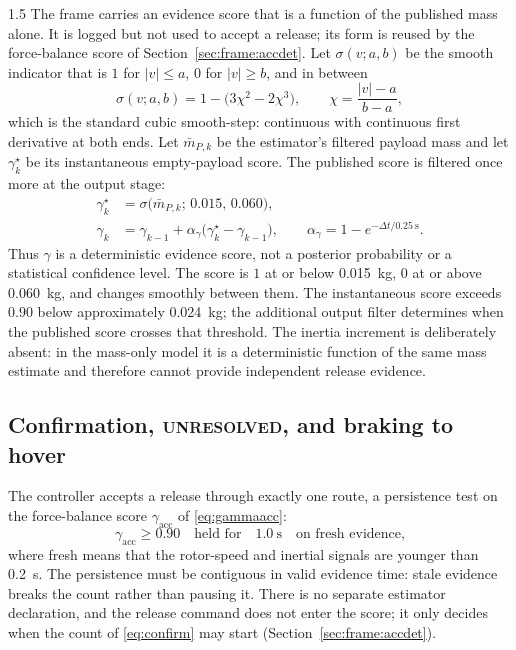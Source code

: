 \begin{spacing}{1.5}
The frame carries an evidence score that is a function of the published mass
alone. It is logged but not used to accept a release; its form is reused by the
force-balance score of Section~\ref{sec:frame:accdet}. Let
$\sigma(v;a,b)$ be the smooth indicator that is $1$
for $|v|\le a$, $0$ for $|v|\ge b$, and in between
\begin{equation}
\sigma(v;a,b) = 1 - \bigl(3\chi^2 - 2\chi^3\bigr),
\qquad \chi = \frac{|v|-a}{b-a},
\label{eq:smoothstep}
\end{equation}
which is the standard cubic smooth-step: continuous with continuous first
derivative at both ends. Let $\bar m_{P,k}$ be the estimator's filtered payload
mass and let $\gamma_k^\star$ be its instantaneous empty-payload score. The
published score is filtered once more at the output stage:
\begin{equation}
\begin{aligned}
\gamma_k^\star &= \sigma\bigl(\bar m_{P,k};\,0.015,\,0.060\bigr),\\
\gamma_k &= \gamma_{k-1}+\alpha_\gamma
              \bigl(\gamma_k^\star-\gamma_{k-1}\bigr),
\qquad
\alpha_\gamma=1-e^{-\Delta t/\SI{0.25}{\second}}.
\end{aligned}
\label{eq:gamma}
\end{equation}
Thus $\gamma$ is a deterministic evidence score, not a posterior probability or
a statistical confidence level. The score is $1$ at or below \SI{0.015}{\kg},
$0$ at or above \SI{0.060}{\kg}, and changes smoothly between them. The
instantaneous score exceeds $0.90$ below approximately \SI{0.024}{\kg}; the
additional output filter determines when the published score crosses that
threshold. The inertia increment is deliberately absent: in the mass-only model
it is a deterministic function of the same mass estimate and therefore cannot
provide independent release evidence.

\subsection{Confirmation, \textsc{unresolved}, and braking to hover}\label{sec:frame:unresolved}

The controller accepts a release through exactly one route, a persistence test
on the force-balance score $\gamma_{\mathrm{acc}}$ of \eqref{eq:gammaacc}:
\begin{equation}
\gamma_{\mathrm{acc}} \ge 0.90 \quad\text{held for}\quad \SI{1.0}{\second}
\quad\text{on fresh evidence,}
\label{eq:confirm}
\end{equation}
where fresh means that the rotor-speed and inertial signals are younger than
\SI{0.2}{\second}. The persistence must be contiguous in valid evidence time:
stale evidence breaks the count rather than pausing it. There is no separate
estimator declaration, and the release command does not enter the score; it only
decides when the count of \eqref{eq:confirm} may start
(Section~\ref{sec:frame:accdet}).


\end{spacing}
